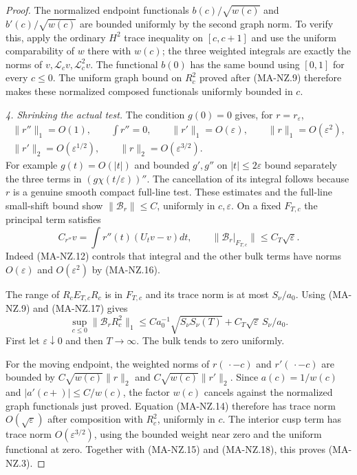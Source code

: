 \begin{proof}
The normalized endpoint functionals
$b(c)/\sqrt{w(c)}$ and $b'(c)/\sqrt{w(c)}$
are bounded uniformly by the second graph norm.
To verify this, apply the ordinary $H^2$ trace inequality
on $[c,c+1]$ and use the uniform comparability of $w$
there with $w(c)$; the three weighted integrals are
exactly the norms of $v,\mathcal L_cv,\mathcal L_c^2v$.
The functional $b(0)$ has the same bound using $[0,1]$
for every $c\le0$.
The uniform graph bound on $R_c^2$ proved after
(MA-NZ.9) therefore makes these normalized composed
functionals uniformly bounded in $c$.

\emph{4. Shrinking the actual test.}
The condition $g(0)=0$ gives, for $r=r_\varepsilon$,
\[
 \begin{gathered}
 \|r''\|_1=O(1),\qquad \int r''=0,\qquad
 \|r'\|_1=O(\varepsilon),\qquad \|r\|_1=O(\varepsilon^2),\\
 \|r'\|_2=O(\varepsilon^{1/2}),\qquad
 \|r\|_2=O(\varepsilon^{3/2}).
 \end{gathered}
 \tag{MA-NZ.16}
\]
For example $g(t)=O(|t|)$ and bounded $g',g''$ on
$|t|\le2\varepsilon$ bound separately the three
terms in $(g\chi(t/\varepsilon))''$.
The cancellation of its integral follows because $r$
is a genuine smooth compact full-line test.
These estimates and the full-line small-shift bound
show $\|\mathcal B_r\|\le C$, uniformly in $c,\varepsilon$.
On a fixed $F_{T,c}$ the principal term satisfies
\[
 C_{r''}v=\int r''(t)(U_tv-v)dt,
 \qquad
 \|\mathcal B_r|_{F_{T,c}}\|
                       \le C_T\sqrt\varepsilon.
 \tag{MA-NZ.17}
\]
Indeed (MA-NZ.12) controls that integral and the other
bulk terms have norms $O(\varepsilon)$ and
$O(\varepsilon^2)$ by (MA-NZ.16).

The range of $R_cE_{T,c}R_c$ is in $F_{T,c}$ and its
trace norm is at most $S_\nu/a_0$.
Using (MA-NZ.9) and (MA-NZ.17) gives
\[
 \sup_{c\le0}\|\mathcal B_rR_c^2\|_1
  \le C a_0^{-1}\sqrt{S_\nu S_\nu(T)}
                   +C_T\sqrt\varepsilon\,S_\nu/a_0.
 \tag{MA-NZ.18}
\]
First let $\varepsilon\downarrow0$ and then $T\to\infty$.
The bulk tends to zero uniformly.

For the moving endpoint, the weighted norms of
$r(\,\cdot-c)$ and $r'(\,\cdot-c)$ are bounded by
$C\sqrt{w(c)}\|r\|_2$ and
$C\sqrt{w(c)}\|r'\|_2$.
Since $a(c)=1/w(c)$ and
$|a'(c+)|\le C/w(c)$, the factor $w(c)$ cancels
against the normalized graph functionals just proved.
Equation (MA-NZ.14) therefore has trace norm
$O(\sqrt\varepsilon)$ after composition with $R_c^2$,
uniformly in $c$.
The interior cusp term has trace norm
$O(\varepsilon^{3/2})$, using the bounded weight near
zero and the uniform functional at zero.
Together with (MA-NZ.15) and (MA-NZ.18), this proves
(MA-NZ.3).
\end{proof}


